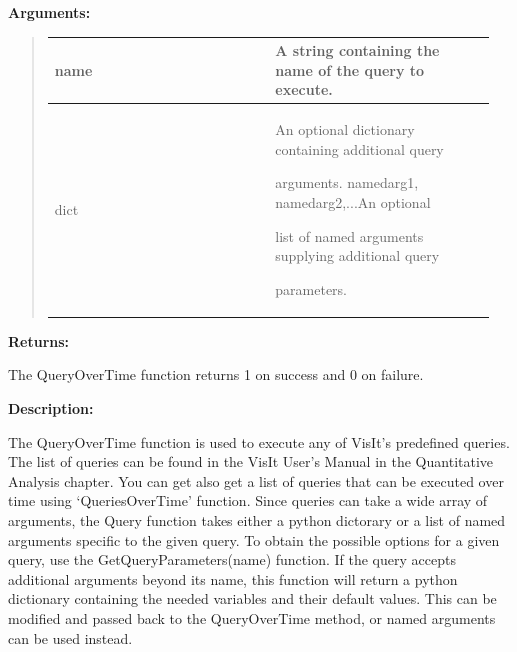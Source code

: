 \documentclass[letterpaper,10pt,english]{sphinxmanual}
\begin{document}
\begin{DUlineblock}{0em}
\item[] 
\item[] \textbf{Arguments:}
\end{DUlineblock}
\begin{quote}

\begin{tabular}{|p{0.475\linewidth}|p{0.475\linewidth}|}
\hline

name
 & 
A string containing the name of the query to execute.
\\
\hline
dict
 & 
\begin{DUlineblock}{0em}
\item[] An optional dictionary containing additional query
\item[] arguments. namedarg1, namedarg2,...An optional
\item[] list of named arguments supplying additional query
\item[] parameters.
\end{DUlineblock}
\\
\hline\end{tabular}

\end{quote}

\begin{DUlineblock}{0em}
\item[] 
\item[] \textbf{Returns:}
\item[] The QueryOverTime function returns 1 on success and 0 on failure.
\item[] 
\item[] \textbf{Description:}
\item[] The QueryOverTime function is used to execute any of VisIt's predefined
queries.
The list of queries can be found in the VisIt User's Manual in the
Quantitative Analysis chapter. You can get also get a list of queries that
can be executed over time using `QueriesOverTime' function.
Since queries can take a wide array of arguments, the Query function takes
either a python dictorary or a list of named arguments specific to the
given query.  To obtain the possible options for a given query, use the
GetQueryParameters(name) function.  If the query accepts additional
arguments beyond its name, this function will return a python dictionary
containing the needed variables and their default values.  This can be
modified and passed back to the QueryOverTime method, or named arguments
can be used instead.
\end{DUlineblock}
\end{document}

